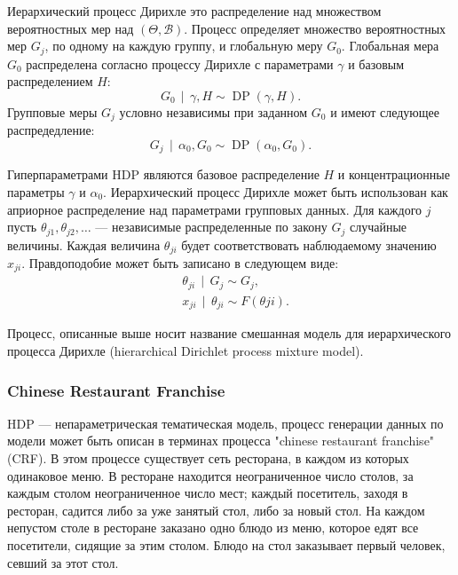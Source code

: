 \documentclass[12pt, a4paper]{article}
\DeclareMathOperator{\DP}{DP}
\DeclareMathOperator{\svert}{\,\vert\,}
\begin{document}
  Иерархический процесс Дирихле это распределение над множеством вероятностных мер над $(\Theta, \mathcal{B})$. Процесс определяет множество вероятностных мер $G_j$, по одному на каждую группу, и глобальную меру $G_0$. Глобальная мера $G_0$ распределена согласно процессу Дирихле с параметрами $\gamma$ и базовым распределением $H$:
  \begin{equation}
  G_0 \svert \gamma, H \sim \DP(\gamma, H).
  \end{equation}
  Групповые меры $G_j$ условно независимы при заданном $G_0$ и имеют следующее распредедление:
  \begin{equation}
  G_j \svert \alpha_0, G_0 \sim \DP(\alpha_0, G_0).
  \end{equation}
  
  Гиперпараметрами HDP являются базовое распределение $H$ и концентрационные параметры $\gamma$ и $\alpha_0$.
  Иерархический процесс Дирихле может быть использован как априорное распределение над параметрами групповых данных. Для каждого $j$ пусть $\theta_{j1}, \theta_{j2}, \ldots$ --- независимые распределенные по закону $G_j$ случайные величины. Каждая величина $\theta_{ji}$ будет соответствовать наблюдаемому значению $x_{ji}$. Правдоподобие может быть записано в следующем виде:
  \begin{equation}
  \begin{aligned}
  & \theta_{ji} \svert G_j \sim G_j, \\
  & x_{ji} \svert \theta_{ji} \sim F(\theta{ji}).
  \end{aligned}
  \end{equation}
  
  Процесс, описанные выше носит название смешанная модель для иерархического процесса Дирихле (hierarchical Dirichlet process mixture model)\cite{hdp-1}.
  
  \subsubsection{Chinese Restaurant Franchise}
  HDP --- непараметрическая тематическая модель, процесс генерации данных по модели может быть описан в терминах процесса "chinese restaurant franchise" (CRF). В этом процессе существует сеть ресторана, в каждом из которых одинаковое меню. В ресторане находится неограниченное число столов, за каждым столом неограниченное число мест; каждый посетитель, заходя в ресторан, садится либо за уже занятый стол, либо за новый стол. На каждом непустом столе в ресторане заказано одно блюдо из меню, которое едят все посетители, сидящие за этим столом. Блюдо на стол заказывает первый человек, севший за этот стол.
  
\end{document}
